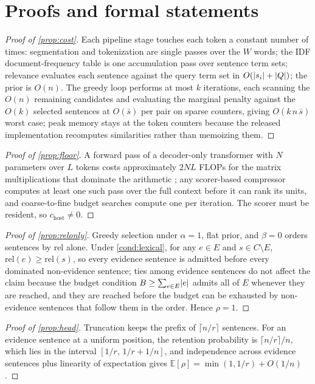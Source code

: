 \documentclass[preprint,12pt]{elsarticle}
\DeclarePairedDelimiter\abs{\lvert}{\rvert}
\theoremstyle{remark}
\begin{document}
\section{Proofs and formal statements}
\label{app:proofs}

\begin{proof}[Proof of \autoref{prop:cost}]
Each pipeline stage touches each token a constant number of times:
segmentation and tokenization are single passes over the $W$ words;
the IDF document-frequency table is one accumulation pass over
sentence term sets; relevance evaluates each sentence against the
query term set in $O(\abs{s_i} + \abs{Q})$; the prior is $O(n)$. The
greedy loop performs at most $k$ iterations, each scanning the $O(n)$
remaining candidates and evaluating the marginal penalty against the
$O(k)$ selected sentences at $O(\bar{s})$ per pair on sparse
counters, giving $O(k\,n\,\bar{s})$ worst case; peak memory stays at
the token counters because the released implementation recomputes
similarities rather than memoizing them.
\end{proof}

\begin{proof}[Proof of \autoref{prop:floor}]
A forward pass of a decoder-only transformer with $N$ parameters over
$L$ tokens costs approximately $2NL$ FLOPs for the matrix
multiplications that dominate the arithmetic
\citep{kaplan2020scaling}; any scorer-based compressor computes at
least one such pass over the full context before it can rank its
units, and coarse-to-fine budget searches compute one per iteration.
The scorer must be resident, so $c_{\mathrm{host}} \ne 0$.
\end{proof}

\begin{proof}[Proof of \autoref{prop:relonly}]
Greedy selection under $\alpha = 1$, flat prior, and $\beta = 0$
orders sentences by $\mathrm{rel}$ alone. Under
\autoref{cond:lexical}, for any $e \in E$ and
$s \in C \setminus E$, $\mathrm{rel}(e) \ge \mathrm{rel}(s)$, so every
evidence sentence is admitted before every dominated non-evidence
sentence; ties among evidence sentences do not affect the claim
because the budget condition
$B \ge \sum_{e \in E} \abs{e}$ admits all of $E$ whenever they are
reached, and they are reached before the budget can be exhausted by
non-evidence sentences that follow them in the order. Hence $\rho=1$.
\end{proof}

\begin{proof}[Proof of \autoref{prop:head}]
Truncation keeps the prefix of $\lceil n/r \rceil$ sentences. For an
evidence sentence at a uniform position, the retention probability is
$\lceil n/r \rceil / n$, which lies in the interval
$[1/r,\, 1/r + 1/n]$, and independence
across evidence sentences plus linearity of expectation gives
$\mathbb{E}[\rho] = \min(1, 1/r) + O(1/n)$.
\end{proof}
\end{document}
